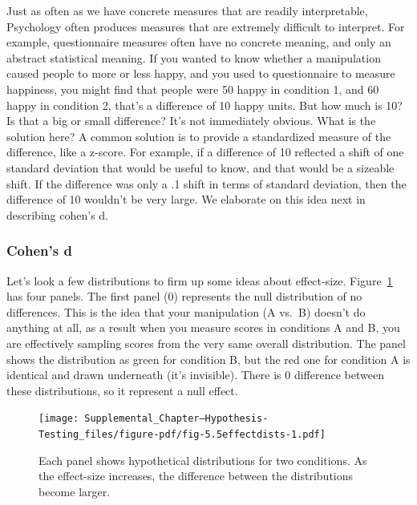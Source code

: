 \documentclass[
  letterpaper,
  DIV=11,
  numbers=noendperiod]{scrartcl}
\begin{document}
Just as often as we have concrete measures that are readily
interpretable, Psychology often produces measures that are extremely
difficult to interpret. For example, questionnaire measures often have
no concrete meaning, and only an abstract statistical meaning. If you
wanted to know whether a manipulation caused people to more or less
happy, and you used to questionnaire to measure happiness, you might
find that people were 50 happy in condition 1, and 60 happy in condition
2, that's a difference of 10 happy units. But how much is 10? Is that a
big or small difference? It's not immediately obvious. What is the
solution here? A common solution is to provide a standardized measure of
the difference, like a z-score. For example, if a difference of 10
reflected a shift of one standard deviation that would be useful to
know, and that would be a sizeable shift. If the difference was only a
.1 shift in terms of standard deviation, then the difference of 10
wouldn't be very large. We elaborate on this idea next in describing
cohen's d.

\hypertarget{cohens-d}{%
\subsubsection{Cohen's d}\label{cohens-d}}

Let's look a few distributions to firm up some ideas about effect-size.
Figure~\ref{fig-5.5effectdists} has four panels. The first panel (0)
represents the null distribution of no differences. This is the idea
that your manipulation (A vs.~B) doesn't do anything at all, as a result
when you measure scores in conditions A and B, you are effectively
sampling scores from the very same overall distribution. The panel shows
the distribution as green for condition B, but the red one for condition
A is identical and drawn underneath (it's invisible). There is 0
difference between these distributions, so it represent a null effect.

\begin{figure}

{\centering \texttt{[image: Supplemental\_Chapter---Hypothesis-Testing\_files/figure-pdf/fig-5.5effectdists-1.pdf]}

}

\caption{\label{fig-5.5effectdists}Each panel shows hypothetical
distributions for two conditions. As the effect-size increases, the
difference between the distributions become larger.}

\end{figure}
\end{document}

